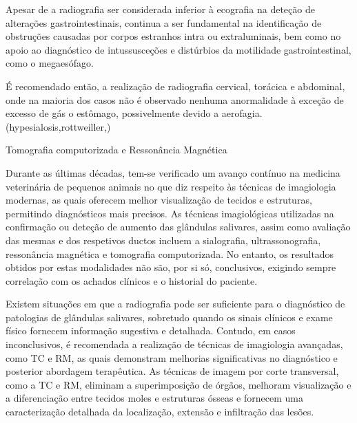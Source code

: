 Apesar de a radiografia ser considerada inferior à ecografia na deteção de alterações gastrointestinais, continua a ser fundamental na identificação de obstruções causadas por corpos estranhos intra ou extraluminais,\cite{Sharma2011} bem como no apoio ao diagnóstico de intussusceções e distúrbios da motilidade gastrointestinal, como o megaesófago. \cite{Jaikumar2013}


É recomendado então, a realização de radiografia cervical, torácica e abdominal, onde na maioria dos casos não é observado nenhuma anormalidade à exceção de excesso de gás o estômago, possivelmente devido a aerofagia. (hypesialosis,rottweiller,\cite{gibbon_phenobarbital-responsive_german_2004})


Tomografia computorizada e Ressonância Magnética


Durante as últimas décadas, tem-se verificado um avanço contínuo na medicina veterinária de pequenos animais no que diz respeito às técnicas de imagiologia modernas, as quais oferecem melhor visualização de tecidos e estruturas, permitindo diagnósticos mais precisos. \cite{gil_anatomic_2018} As técnicas imagiológicas utilizadas na confirmação ou deteção de aumento das glândulas salivares, assim como avaliação das mesmas e dos respetivos ductos incluem a sialografia, ultrassonografia, ressonância magnética e tomografia computorizada. \cite{boydell_sialadenosis_2000,gil_anatomic_2018} No entanto, os resultados obtidos por estas modalidades não são, por si só, conclusivos, exigindo sempre correlação com os achados clínicos e o historial do paciente. \cite{boydell_sialadenosis_2000,gil_anatomic_2018}


Existem situações em que a radiografia pode ser suficiente para o diagnóstico de patologias de glândulas salivares, sobretudo quando os sinais clínicos e exame físico fornecem informação sugestiva e detalhada. \cite{gil_anatomic_2018,perez-ecija_granulomatous_2012} Contudo, em casos inconclusivos, é recomendada a realização de técnicas de imagiologia avançadas, como TC e RM, \cite{gil_anatomic_2018,durand_computed_2016} as quais demonstram melhorias significativas no diagnóstico e posterior abordagem terapêutica.\cite{durand_computed_2016} As técnicas de imagem por corte transversal, como a TC e RM, eliminam a superimposição de órgãos, \cite{seiler_acvr_2022,durand_computed_2016} melhoram visualização e a diferenciação entre tecidos moles e estruturas ósseas e fornecem uma caracterização detalhada da localização, extensão e infiltração das lesões. \cite{durand_computed_2016}


